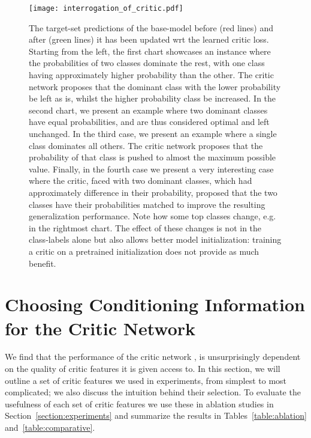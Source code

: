 \documentclass{article} \usepackage[dvipsnames]{xcolor}
\begin{document}
 \begin{figure}[!htbp]
     \centering
     \texttt{[image: interrogation\_of\_critic.pdf]}
     \caption{The target-set predictions of the base-model before (red lines) and after (green lines) it has been updated wrt the learned critic loss. Starting from the left, the first chart showcases an instance where the probabilities of two classes dominate the rest, with one class having approximately  higher probability than the other. The critic network proposes that the dominant class with the lower probability be left as is, whilst the higher probability class be increased. In the second chart, we present an example where two dominant classes have equal probabilities, and are thus considered optimal and left unchanged. In the third case, we present an example where a single class dominates all others. The critic network proposes that the probability of that class is pushed to almost the maximum possible value. Finally, in the fourth case we present a very interesting case where the critic, faced with two dominant classes, which had approximately  difference in their probability, proposed that the two classes have their probabilities matched to improve the resulting generalization performance. Note how some top classes change, e.g. in the rightmost chart. The effect of these changes is not in the class-labels alone but also allows better model initialization: training a critic on a pretrained initialization does not provide as much benefit. 
}
     \label{fig:critic_insight_mini}
     \vspace{-5.0mm}
 \end{figure}
\raggedbottom






\section{Choosing Conditioning Information for the Critic Network}\label{section:critic-features}
We find that the performance of the critic network , is unsurprisingly dependent on the quality of critic features it is given access to. In this section, we will outline a set of critic features we used in experiments, from simplest to most complicated; we also discuss the intuition behind their selection. To evaluate the usefulness of each set of critic features we use these in ablation studies in Section~\ref{section:experiments} and summarize the results in Tables~\ref{table:ablation} and~\ref{table:comparative}.
\end{document}
